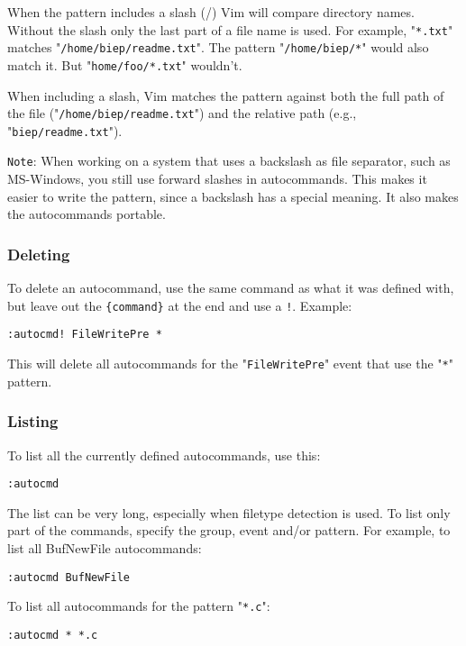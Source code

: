 When the pattern includes a slash (/) Vim will compare directory names.
Without the slash only the last part of a file name is used.
For example, "\texttt{*.txt}" matches "\texttt{/home/biep/readme.txt}".
The pattern "\texttt{/home/biep/*}" would also match it.
But "\texttt{home/foo/*.txt}" wouldn't.

When including a slash, Vim matches the pattern against both the full path of the file ("\texttt{/home/biep/readme.txt}") and the relative path (e.g., "\texttt{biep/readme.txt}").

\texttt{Note}: When working on a system that uses a backslash as file separator, such as MS-Windows, you still use forward slashes in autocommands.
This makes it easier to write the pattern, since a backslash has a special meaning.
It also makes the autocommands portable.

\subsubsection{Deleting}
To delete an autocommand, use the same command as what it was defined with, but leave out the \texttt{\{command\}} at the end and use a \texttt{!}.
Example:

\begin{Verbatim}[samepage=true]
 :autocmd! FileWritePre *
\end{Verbatim}

This will delete all autocommands for the "\texttt{FileWritePre}" event that use the "\texttt{*}" pattern.
\subsubsection{Listing}
To list all the currently defined autocommands, use this:

\begin{Verbatim}[samepage=true]
 :autocmd
\end{Verbatim}

The list can be very long, especially when filetype detection is used.
To list only part of the commands, specify the group, event and/or pattern.
For example, to list all BufNewFile autocommands:

\begin{Verbatim}[samepage=true]
 :autocmd BufNewFile
\end{Verbatim}

To list all autocommands for the pattern "\texttt{*.c}":

\begin{Verbatim}[samepage=true]
 :autocmd * *.c
\end{Verbatim}

